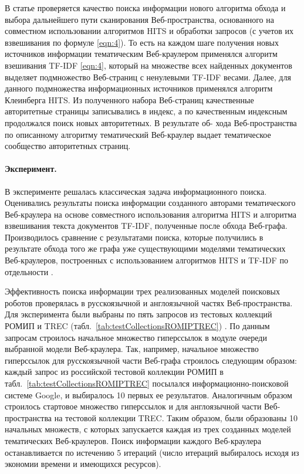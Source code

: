 В статье проверяется качество поиска информации нового алгоритма обхода и выбора дальнейшего пути сканирования Веб-пространства, основанного на совместном использовании алгоритмов HITS и обработки запросов (с учетов их взвешивания по формуле \cref{eqn:4}). То есть на каждом шаге получения новых источников информации тематическим Веб-краулером применялся алгоритм взешивания TF-IDF \cref{eqn:4}, который на множестве всех найденных документов выделяет подмножество Веб-страниц с ненулевыми TF-IDF весами. Далее, для данного подмножества информационных источников применялся алгоритм Клеинберга HITS. Из полученного набора Веб-страниц качественные авторитетные страницы записывались в индекс, а по качественным индексным продолжался поиск новых авторитетных. В результате об- хода Веб-пространства по описанному алгоритму тематический Веб-краулер выдает тематическое сообщество \cite{GibsonKleinbergRaghavan} авторитетных страниц.

\paragraph{Эксперимент.} В эксперименте решалась классическая задача информационного поиска. Оценивались результаты поиска информации созданного авторами тематического Веб-краулера на основе совместного использования алгоритма HITS и алгоритма взвешивания текста документов TF-IDF, полученные после обхода Веб-графа. Производилось сравнение с результатами поиска, которые получились в результате обхода того же графа уже существующими моделями тематических Веб-краулеров, построенных с использованием алгоритмов HITS и TF-IDF по отдельности \cite{BlekanovBondarenko2,Nekrestyanov}.

Эффективность поиска информации трех реализованных моделей поисковых роботов проверялась в русскоязычной и англоязычной частях Веб-пространства. Для эксперимента были выбраны по пять запросов из тестовых коллекций РОМИП и TREC (табл.~\cref{tab:testCollectionsROMIPTREC}) \cite{RussianSeminar,TREC}. По данным запросам строилось начальное множество гиперссылок в модуле очереди выбранной модели Веб-краулера. Так, например, начальное множество гиперссылок для русскоязычной части Веб-графа строилось следующим образом: каждый запрос из российской тестовой коллекции РОМИП в табл.~\cref{tab:testCollectionsROMIPTREC} посылался информационно-поисковой системе Google, и выбиралось 10 первых ее результатов. Аналогичным образом строилось стартовое множество гиперссылок и для англоязычной части Веб-пространства на тестовой коллекции TREC. Таким образом, были образованы 10 начальных множеств, с которых запускается каждая из трех созданных моделей тематических Веб-краулеров. Поиск информации каждого Веб-краулера останавливается по истечению 5 итераций (число итераций выбиралось исходя из экономии времени и имеющихся ресурсов).

